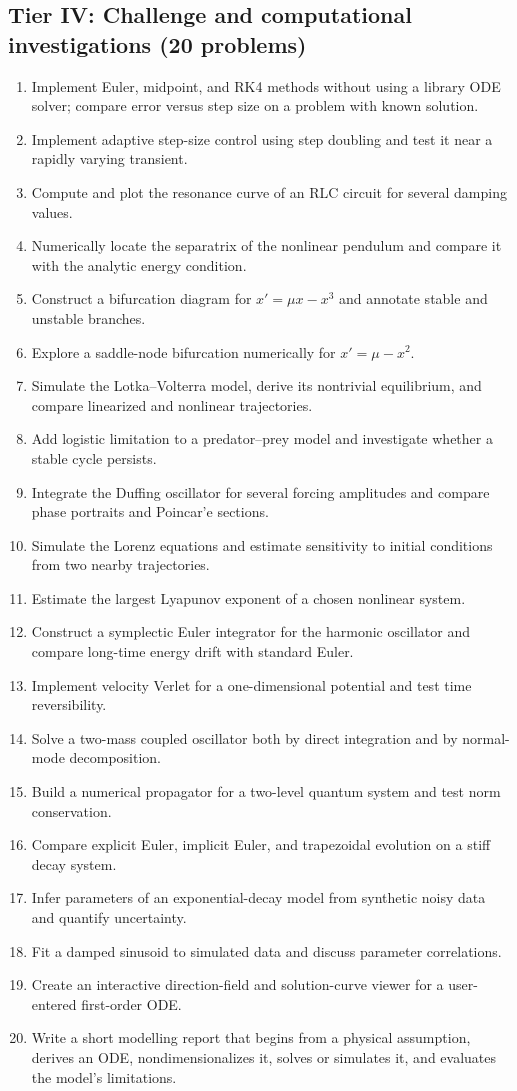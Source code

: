 \subsection*{Tier IV: Challenge and computational investigations (20 problems)}
\begin{enumerate}[label=\textbf{\arabic*.},leftmargin=*]
\item Implement Euler, midpoint, and RK4 methods without using a library ODE solver; compare error versus step size on a problem with known solution.
\item Implement adaptive step-size control using step doubling and test it near a rapidly varying transient.
\item Compute and plot the resonance curve of an RLC circuit for several damping values.
\item Numerically locate the separatrix of the nonlinear pendulum and compare it with the analytic energy condition.
\item Construct a bifurcation diagram for $x'=\mu x-x^3$ and annotate stable and unstable branches.
\item Explore a saddle-node bifurcation numerically for $x'=\mu-x^2$.
\item Simulate the Lotka--Volterra model, derive its nontrivial equilibrium, and compare linearized and nonlinear trajectories.
\item Add logistic limitation to a predator--prey model and investigate whether a stable cycle persists.
\item Integrate the Duffing oscillator for several forcing amplitudes and compare phase portraits and Poincar'e sections.
\item Simulate the Lorenz equations and estimate sensitivity to initial conditions from two nearby trajectories.
\item Estimate the largest Lyapunov exponent of a chosen nonlinear system.
\item Construct a symplectic Euler integrator for the harmonic oscillator and compare long-time energy drift with standard Euler.
\item Implement velocity Verlet for a one-dimensional potential and test time reversibility.
\item Solve a two-mass coupled oscillator both by direct integration and by normal-mode decomposition.
\item Build a numerical propagator for a two-level quantum system and test norm conservation.
\item Compare explicit Euler, implicit Euler, and trapezoidal evolution on a stiff decay system.
\item Infer parameters of an exponential-decay model from synthetic noisy data and quantify uncertainty.
\item Fit a damped sinusoid to simulated data and discuss parameter correlations.
\item Create an interactive direction-field and solution-curve viewer for a user-entered first-order ODE.
\item Write a short modelling report that begins from a physical assumption, derives an ODE, nondimensionalizes it, solves or simulates it, and evaluates the model's limitations.
\end{enumerate}
